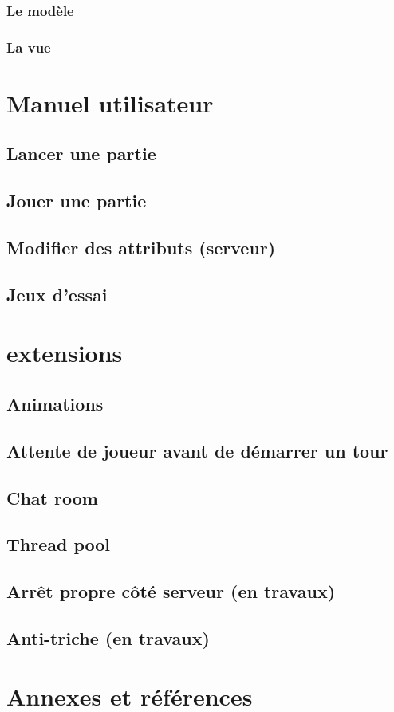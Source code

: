 \documentclass[11pt]{article}
\begin{document}
\subsubsection{Le modèle}
\subsubsection{La vue}

\section{Manuel utilisateur}
\subsection{Lancer une partie}
\subsection{Jouer une partie}
\subsection{Modifier des attributs (serveur)}
\subsection{Jeux d'essai}

\section{extensions}
\subsection{Animations}
\subsection{Attente de joueur avant de démarrer un tour}
\subsection{Chat room}
\subsection{Thread pool}
\subsection{Arrêt propre côté serveur (en travaux)}
\subsection{Anti-triche (en travaux)}

\section{Annexes et références}
\end{document}
